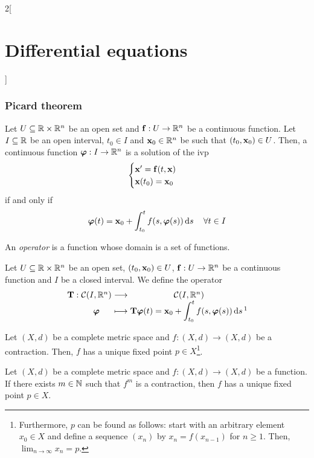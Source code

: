 \documentclass[../../../main.tex]{subfiles}
\begin{document}
\begin{multicols}{2}[\section{Differential equations}]
  \subsubsection{Picard theorem}
  \begin{proposition}
    Let $U\subseteq\mathbb{R}\times\mathbb{R}^n$ be an open set and $\boldsymbol{\mathrm{f}}:U\rightarrow\mathbb{R}^n$ be a continuous function. Let $I\subseteq\mathbb{R}$ be an open interval, $t_0\in I$ and $\boldsymbol{\mathrm{x}}_0\in\mathbb{R}^n$ be such that $(t_0,\boldsymbol{\mathrm{x}}_0)\in U$. Then, a continuous function $\boldsymbol{\mathrm{\varphi}}:I\rightarrow\mathbb{R}^n$ is a solution of the ivp
    \begin{equation}
      \begin{cases}
        \boldsymbol{\mathrm{x}}'=\boldsymbol{\mathrm{f}}(t,\boldsymbol{\mathrm{x}}) \\
        \boldsymbol{\mathrm{x}}(t_0)=\boldsymbol{\mathrm{x}}_0
      \end{cases}
      \label{DE_ivp}
    \end{equation}
    if and only if $$\boldsymbol{\mathrm{\varphi}}(t)=\boldsymbol{\mathrm{x}}_0+\int_{t_0}^tf(s,\boldsymbol{\mathrm{\varphi}}(s))\dd{s}\quad\forall t\in I$$
  \end{proposition}
  \begin{definition}
    An \emph{operator} is a function whose domain is a set of functions.
  \end{definition}
  \begin{definition}
    Let $U\subseteq\mathbb{R}\times\mathbb{R}^n$ be an open set, $(t_0,\boldsymbol{\mathrm{x}}_0)\in U$, $\boldsymbol{\mathrm{f}}:U\rightarrow\mathbb{R}^n$ be a continuous function and $I$ be a closed interval. We define the operator
    $$
      \function{\vf{T}}
      {\mathcal{C}(I,\RR^n)}
      {\mathcal{C}(I,\RR^n)}
      {\vf{\varphi}}
      {\displaystyle\vf{T}\vf{\varphi}(t)=\vf{x}_0+\int_{t_0}^tf(s,\vf{\varphi}(s))\dd{s}\footnotemark}
    $$
  \end{definition}
  \begin{theorem}
    Let $(X,d)$ be a complete metric space and $f:(X,d)\rightarrow (X,d)$ be a contraction. Then, $f$ has a unique fixed point $p\in X$\footnote{Furthermore, $p$ can be found as follows: start with an arbitrary element $x_0\in X$ and define a sequence $(x_n)$ by $x_n=f(x_{n-1})$ for $n\geq 1$. Then, $\displaystyle\lim_{n\to\infty} x_n=p$.}.
  \end{theorem}
  \begin{corollary}
    Let $(X,d)$ be a complete metric space and $f:(X,d)\rightarrow (X,d)$ be a function. If there exists $m\in\mathbb{N}$ such that $f^m$ is a contraction, then $f$ has a unique fixed point $p\in X$.

\end{corollary}
\end{multicols}
\end{document}
